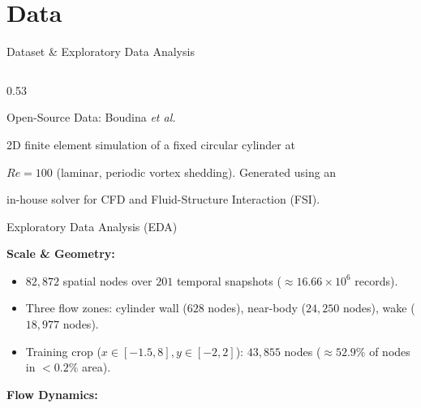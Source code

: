 \documentclass[12pt]{beamer}
\begin{document}

\section{Data}


\begin{frame}{Dataset \& Exploratory Data Analysis}

  \begin{columns}[T]

    \begin{column}{0.53\textwidth}

      \begin{block}{Open-Source Data: Boudina \textit{et al.}}

        2D finite element simulation of a fixed circular cylinder at

$Re = 100$ (laminar, periodic vortex shedding). Generated using an

        in-house solver for CFD and Fluid-Structure Interaction (FSI).

      \end{block}

      \vspace{0.5em}

      \begin{block}{Exploratory Data Analysis (EDA)}

        \textbf{Scale \& Geometry:}

        \begin{itemize}

          \item $82,872$ spatial nodes over $201$ temporal snapshots ($\approx 16.66\times 10^6$ records).

          \item Three flow zones: cylinder wall ($628$ nodes), near-body ($24,250$ nodes), wake ($18,977$ nodes).

          \item Training crop ($x \in [-1.5, 8], y \in [-2, 2]$): $43,855$ nodes ($\approx 52.9\%$ of nodes in $<0.2\%$ area).

        \end{itemize}

        \vspace{0.3em}

        \textbf{Flow Dynamics:}


\end{block}
\end{column}
\end{columns}
\end{frame}
\end{document}
